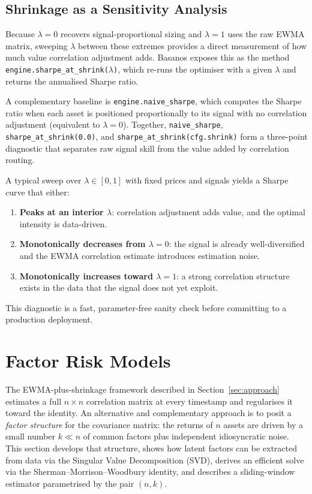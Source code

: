 \documentclass[11pt,a4paper]{article}
\begin{document}
\subsection{Shrinkage as a Sensitivity Analysis}
\label{sec:sensitivity}

Because $\lambda = 0$ recovers signal-proportional sizing and $\lambda = 1$
uses the raw EWMA matrix, sweeping $\lambda$ between these extremes provides
a direct measurement of how much value correlation adjustment adds.
Basanos exposes this as the method
\texttt{engine.sharpe\_at\_shrink($\lambda$)}, which re-runs the optimiser
with a given $\lambda$ and returns the annualised Sharpe ratio.

A complementary baseline is \texttt{engine.naive\_sharpe}, which computes the
Sharpe ratio when each asset is positioned proportionally to its signal
with no correlation adjustment (equivalent to $\lambda = 0$).  Together,
\texttt{naive\_sharpe}, \texttt{sharpe\_at\_shrink(0.0)}, and
\texttt{sharpe\_at\_shrink(cfg.shrink)} form a three-point diagnostic that
separates raw signal skill from the value added by correlation routing.

A typical sweep over $\lambda \in [0, 1]$ with fixed prices and signals
yields a Sharpe curve that either:
\begin{enumerate}
  \item \textbf{Peaks at an interior $\lambda$}: correlation adjustment
    adds value, and the optimal intensity is data-driven.
  \item \textbf{Monotonically decreases from $\lambda = 0$}: the signal is
    already well-diversified and the EWMA correlation estimate introduces
    estimation noise.
  \item \textbf{Monotonically increases toward $\lambda = 1$}: a strong
    correlation structure exists in the data that the signal does not yet
    exploit.
\end{enumerate}
This diagnostic is a fast, parameter-free sanity check before committing
to a production deployment.

\section{Factor Risk Models}
\label{sec:factor_models}

The EWMA-plus-shrinkage framework described in Section~\ref{sec:approach}
estimates a full $n \times n$ correlation matrix at every timestamp and
regularises it toward the identity.  An alternative and complementary approach
is to posit a \emph{factor structure} for the covariance matrix: the returns
of $n$ assets are driven by a small number $k \ll n$ of common factors plus
independent idiosyncratic noise.  This section develops that structure, shows
how latent factors can be extracted from data via the Singular Value
Decomposition (SVD), derives an efficient solve via the
Sherman--Morrison--Woodbury identity, and describes a sliding-window estimator
parametrised by the pair $(n, k)$.
\end{document}
